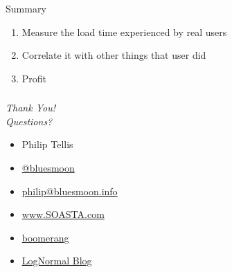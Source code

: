 \documentclass{beamer}
\newcommand{\innersplash}[1]{
  \begin{center}
    \Large \textrm{\textit{ #1 } }
  \end{center}
}
\newcommand{\splashslide}[2][{}]{
  \begin{frame}
  \frametitle{#1}
  \innersplash{#2}
  \end{frame}
}
\begin{document}
\begin{frame}{Summary}
  \begin{enumerate}
  \item<1-> Measure the load time experienced by real users
  \item<2-> Correlate it with other things that user did
  \item<3-> Profit
  \end{enumerate}
\end{frame}

\splashslide{Thank You! \\ Questions?}

\begin{frame}
  \begin{itemize}
  \item Philip Tellis
  \item \href{http://twitter.com/bluesmoon}{@bluesmoon}
  \item \href{http://bluesmoon.info/}{philip@bluesmoon.info}
  \item \href{http://www.soasta.com/}{www.SOASTA.com}
  \item \href{http://lognormal.github.com/boomerang/doc/}{boomerang}
  \item \href{http://www.lognormal.com/blog/}{LogNormal Blog}
  \end{itemize}
\end{frame}
\end{document}
